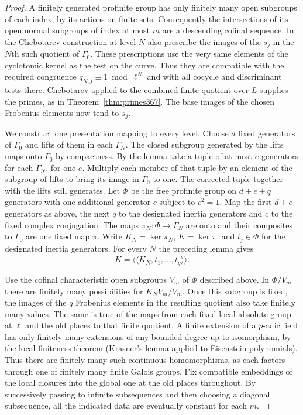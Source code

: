 \documentclass[a4paper,11pt]{article}
\theoremstyle{definition}
\theoremstyle{remark}
\numberwithin{equation}{section}
\begin{document}
\begin{proof}
A finitely generated profinite group has only finitely many
open subgroups of each index, by its actions on finite sets.
Consequently the intersections of its open normal subgroups
of index at most \(m\) are a descending cofinal sequence.
In the Chebotarev construction at level \(N\) also prescribe
the images of the \(s_j\) in the \(N\)th such quotient of
\(\Gamma_0\). These prescriptions use the very same elements
of the cyclotomic kernel as the test on the curve. Thus they
are compatible with the required congruence
\(q_{N,j}\equiv1\bmod\ell^N\) and with all cocycle and
discriminant tests there. Chebotarev applied to the combined
finite quotient over \(L\) supplies the primes, as in
Theorem~\ref{thm:primes367}. The base images of the chosen
Frobenius elements now tend to \(s_j\).

We construct one presentation mapping to every level.
Choose \(d\) fixed generators of \(\Gamma_0\) and lifts of
them in each \(\Gamma_N\). The closed subgroup generated by
the lifts maps onto \(\Gamma_0\) by compactness. By the lemma
take a tuple of at most \(e\) generators for each \(\Gamma_N\),
for one \(e\). Multiply each member of that tuple by an
element of the subgroup of lifts to bring its image in
\(\Gamma_0\) to one. The corrected tuple together with the
lifts still generates. Let \(\Phi\) be the free profinite
group on \(d+e+q\) generators with one additional generator
\(c\) subject to \(c^2=1\). Map the first \(d+e\) generators
as above, the next \(q\) to the designated inertia generators
and \(c\) to the fixed complex conjugation. The maps
\(\pi_N:\Phi\to\Gamma_N\) are onto and their composites to
\(\Gamma_0\) are one fixed map \(\pi\). Write \(K_N=\ker\pi_N\),
\(K=\ker\pi\), and \(t_j\in\Phi\) for the designated inertia
generators. For every \(N\) the preceding lemma gives
\[
         K=\overline{\langle\!\langle K_N,t_1,\ldots,t_q
                                           \rangle\!\rangle}.
\]

Use the cofinal characteristic open subgroups \(V_m\) of
\(\Phi\) described above. In \(\Phi/V_m\) there are finitely
many possibilities for \(K_NV_m/V_m\). Once this subgroup
is fixed, the images of the \(q\) Frobenius elements in the
resulting quotient also take finitely many values. The
same is true of the maps from each fixed local absolute
group at \(\ell\) and the old places to that finite quotient.
A finite extension of a \(p\)-adic field has only finitely
many extensions of any bounded degree up to isomorphism,
by the local finiteness theorem (Krasner's lemma applied to
Eisenstein polynomials). Thus there are finitely many such
continuous homomorphisms, as each factors through one of
finitely many finite Galois groups. Fix compatible embeddings
of the local closures into the global one at the old places
throughout. By successively passing to infinite subsequences
and then choosing a diagonal subsequence, all the indicated
data are eventually constant for each \(m\).


\end{proof}
\end{document}
